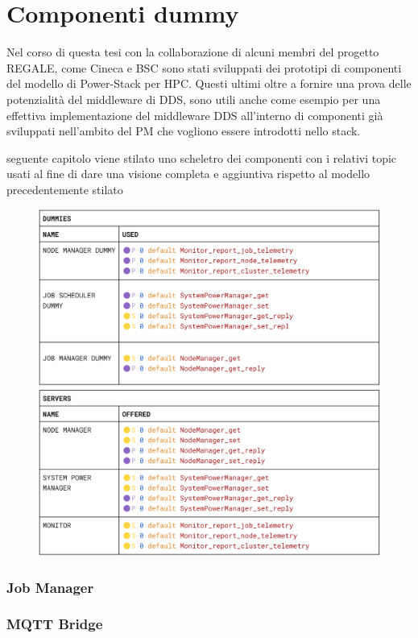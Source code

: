 \chapter{Componenti dummy}
Nel corso di questa tesi con la collaborazione di alcuni membri del progetto REGALE, come Cineca\cite{TODO} e BSC\cite{TODO} sono stati sviluppati dei prototipi di componenti del modello di Power-Stack per HPC.
Questi ultimi oltre a fornire una prova delle potenzialità del middleware di DDS, sono utili anche come esempio per una effettiva implementazione del middleware DDS all'interno di componenti già sviluppati nell'ambito del PM che vogliono essere introdotti nello stack.


seguente capitolo viene stilato uno scheletro dei componenti con i relativi topic usati al fine di dare una visione completa e aggiuntiva rispetto al modello precedentemente stilato  
\begin{figure}[H]
    \centering
    \includegraphics[width=\textwidth]{./img/dummies_skeleton.png}
    \includegraphics[width=\textwidth]{./img/server_skeleton.png}
\end{figure}
\subsection{Job Manager}
\subsection{MQTT Bridge}